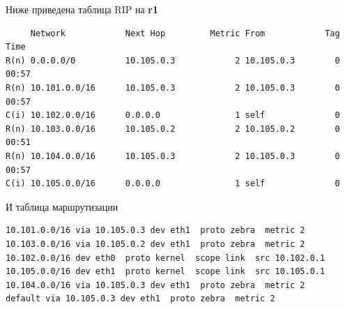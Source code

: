 \documentclass[a4paper,12pt]{article}
\begin{document}
Ниже приведена таблица RIP на \textbf{r1}
\begin{verbatim}
     Network            Next Hop         Metric From            Tag Time
R(n) 0.0.0.0/0          10.105.0.3            2 10.105.0.3        0 00:57
R(n) 10.101.0.0/16      10.105.0.3            2 10.105.0.3        0 00:57
C(i) 10.102.0.0/16      0.0.0.0               1 self              0
R(n) 10.103.0.0/16      10.105.0.2            2 10.105.0.2        0 00:51
R(n) 10.104.0.0/16      10.105.0.3            2 10.105.0.3        0 00:57
C(i) 10.105.0.0/16      0.0.0.0               1 self              0
\end{verbatim}

И таблица маршрутизации
\begin{verbatim}
10.101.0.0/16 via 10.105.0.3 dev eth1  proto zebra  metric 2 
10.103.0.0/16 via 10.105.0.2 dev eth1  proto zebra  metric 2 
10.102.0.0/16 dev eth0  proto kernel  scope link  src 10.102.0.1 
10.105.0.0/16 dev eth1  proto kernel  scope link  src 10.105.0.1 
10.104.0.0/16 via 10.105.0.3 dev eth1  proto zebra  metric 2 
default via 10.105.0.3 dev eth1  proto zebra  metric 2 
\end{verbatim}
\end{document}
